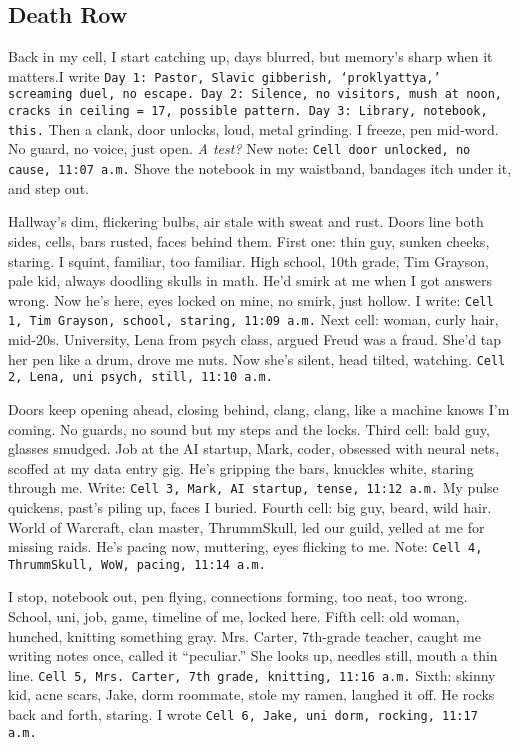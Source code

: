\documentclass[12pt]{article}
\newcommand{\note}[1]{\texttt{#1}}
\begin{document}
\subsection*{Death Row}
Back in my cell, I start catching up, days blurred, but memory’s sharp when it matters.I write \note{Day 1: Pastor, Slavic gibberish, ‘proklyattya,’ screaming duel, no escape. Day 2: Silence, no visitors, mush at noon, cracks in ceiling = 17, possible pattern. Day 3: Library, notebook, this.} Then a clank, door unlocks, loud, metal grinding. I freeze, pen mid-word. No guard, no voice, just open. \textit{A test?} New note: \note{Cell door unlocked, no cause, 11:07 a.m.} Shove the notebook in my waistband, bandages itch under it, and step out.

Hallway’s dim, flickering bulbs, air stale with sweat and rust. Doors line both sides, cells, bars rusted, faces behind them. First one: thin guy, sunken cheeks, staring. I squint, familiar, too familiar. High school, 10th grade, Tim Grayson, pale kid, always doodling skulls in math. He’d smirk at me when I got answers wrong. Now he’s here, eyes locked on mine, no smirk, just hollow. I write: \note{Cell 1, Tim Grayson, school, staring, 11:09 a.m.} Next cell: woman, curly hair, mid-20s. University, Lena from psych class, argued Freud was a fraud. She’d tap her pen like a drum, drove me nuts. Now she’s silent, head tilted, watching. \note{Cell 2, Lena, uni psych, still, 11:10 a.m.}

Doors keep opening ahead, closing behind, clang, clang, like a machine knows I’m coming. No guards, no sound but my steps and the locks. Third cell: bald guy, glasses smudged. Job at the AI startup, Mark, coder, obsessed with neural nets, scoffed at my data entry gig. He’s gripping the bars, knuckles white, staring through me. Write: \note{Cell 3, Mark, AI startup, tense, 11:12 a.m.} My pulse quickens, past’s piling up, faces I buried. Fourth cell: big guy, beard, wild hair. World of Warcraft, clan master, ThrummSkull, led our guild, yelled at me for missing raids. He’s pacing now, muttering, eyes flicking to me. Note: \note{Cell 4, ThrummSkull, WoW, pacing, 11:14 a.m.}

I stop, notebook out, pen flying, connections forming, too neat, too wrong. School, uni, job, game, timeline of me, locked here. Fifth cell: old woman, hunched, knitting something gray. Mrs. Carter, 7th-grade teacher, caught me writing notes once, called it “peculiar.” She looks up, needles still, mouth a thin line. \note{Cell 5, Mrs. Carter, 7th grade, knitting, 11:16 a.m.} Sixth: skinny kid, acne scars, Jake, dorm roommate, stole my ramen, laughed it off. He rocks back and forth, staring. I wrote \note{Cell 6, Jake, uni dorm, rocking, 11:17 a.m.}
\end{document}
